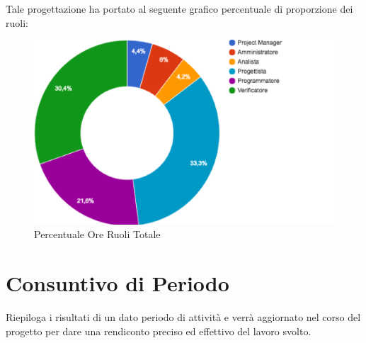 \documentclass[12pt,a4paper,titlepage]{article}
\begin{document}
	Tale progettazione ha portato al seguente grafico percentuale di proporzione dei ruoli:
	
	\begin{figure}[p]
		\centering
		\includegraphics[width=0.7\linewidth]{"GraficoTortaRuoliFinale"}
		\caption{Percentuale Ore Ruoli Totale}
		\label{fig:percentuale-ore-ruoli-totale}
	\end{figure} 
	
	\newpage
	
	\section{Consuntivo di Periodo}
		Riepiloga i risultati di un dato periodo di attività e verrà aggiornato nel corso del progetto per dare una rendiconto preciso ed effettivo del lavoro svolto. \\
\end{document}
